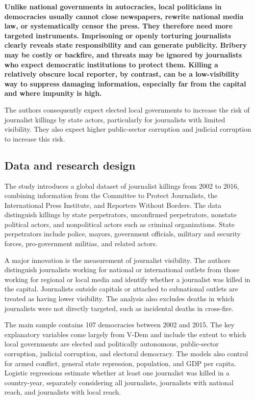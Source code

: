 \textbf{Unlike national governments in autocracies, local politicians in democracies usually cannot close newspapers, rewrite national media law, or systematically censor the press. They therefore need more targeted instruments. Imprisoning or openly torturing journalists clearly reveals state responsibility and can generate publicity. Bribery may be costly or backfire, and threats may be ignored by journalists who expect democratic institutions to protect them. Killing a relatively obscure local reporter, by contrast, can be a low-visibility way to suppress damaging information, especially far from the capital and where impunity is high.}

The authors consequently expect elected local governments to increase the risk of journalist killings by state actors, particularly for journalists with limited visibility. They also expect higher public-sector corruption and judicial corruption to increase this risk.

\subsection{Data and research design}

The study introduces a global dataset of journalist killings from 2002 to 2016, combining information from the Committee to Protect Journalists, the International Press Institute, and Reporters Without Borders. The data distinguish killings by state perpetrators, unconfirmed perpetrators, nonstate political actors, and nonpolitical actors such as criminal organizations. State perpetrators include police, mayors, government officials, military and security forces, pro-government militias, and related actors.

A major innovation is the measurement of journalist visibility. The authors distinguish journalists working for national or international outlets from those working for regional or local media and identify whether a journalist was killed in the capital. Journalists outside capitals or attached to subnational outlets are treated as having lower visibility. The analysis also excludes deaths in which journalists were not directly targeted, such as incidental deaths in cross-fire.

The main sample contains 107 democracies between 2002 and 2015. The key explanatory variables come largely from V-Dem and include the extent to which local governments are elected and politically autonomous, public-sector corruption, judicial corruption, and electoral democracy. The models also control for armed conflict, general state repression, population, and GDP per capita. Logistic regressions estimate whether at least one journalist was killed in a country-year, separately considering all journalists, journalists with national reach, and journalists with local reach.

